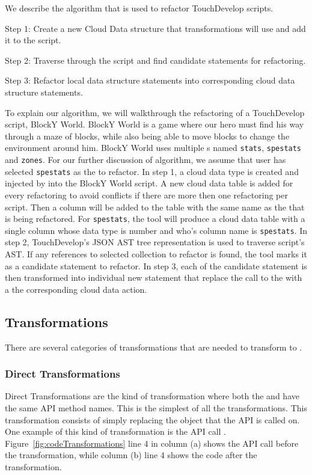 \documentclass{sigplanconf}
\begin{document}
We describe the algorithm that is used to refactor TouchDevelop scripts.   

Step 1: Create a new Cloud Data structure that transformations will use and add it to the script.

Step 2: Traverse through the script and find candidate statements for refactoring.

Step 3: Refactor local data structure statements into corresponding cloud data structure statements.

To explain our algorithm, we will walkthrough the refactoring of a TouchDevelop script, BlockY World.  BlockY World is a game where our hero must find his way through a maze of blocks, while also being able to move blocks to change the environment around him.  BlockY World uses multiple \NC{}s named \texttt{stats}, \texttt{spestats} and \texttt{zones}. For our further discussion of algorithm, we assume that user has selected \texttt{spestats} as the \NC{} to refactor. In step 1, a cloud data type is created and injected by \tool into the BlockY World script.  A new cloud data table is added for every refactoring to avoid conflicts if there are more then one refactoring per script. Then a column will be added to the table with the same name as the \NC{} that is being refactored.  For \texttt{spestats}, the tool will produce a cloud data table with a single column whose data type is number and who's column name is \texttt{spestats}.  In step 2, TouchDevelop's JSON AST tree representation is used to traverse script's AST. If any references to selected collection to refactor is found, the tool marks it as a candidate statement to refactor.  In step 3, each of the candidate statement is then transformed into individual new statement that replace the call to the \NC{} with a the corresponding cloud data action. 



\subsection{Transformations}
\label{sec:transformations}

There are several categories of transformations that are needed to transform \NC{} to .  

\subsubsection{Direct Transformations}
Direct Transformations are the kind of transformation where both the \NC{} and \CDT have the same API method names.  This is the simplest of all the transformations.  This transformation consists of simply replacing the object that the API is called on.  One example of this kind of transformation is the API call .
Figure~\ref{fig:codeTransformations} line 4 in column (a) shows the API call before the transformation, while column (b) line 4 shows the code after the transformation.
\end{document}
